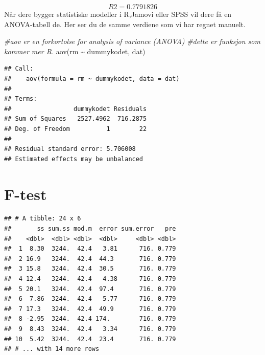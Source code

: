 \documentclass[
]{book}
\newenvironment{Shaded}{\begin{snugshade}}{\end{snugshade}}
\newcommand{\CommentTok}[1]{\textcolor[rgb]{0.56,0.35,0.01}{\textit{#1}}}
\newcommand{\FunctionTok}[1]{\textcolor[rgb]{0.00,0.00,0.00}{#1}}
\newcommand{\NormalTok}[1]{#1}
\newcommand{\SpecialCharTok}[1]{\textcolor[rgb]{0.00,0.00,0.00}{#1}}
\begin{document}
\[
R2 = 0.7791826
\]
Når dere bygger statistiske modeller i R,Jamovi eller SPSS vil dere få en ANOVA-tabell de. Her ser du de samme verdiene som vi har regnet manuelt.

\begin{Shaded}
\begin{Highlighting}[]
\CommentTok{\#aov er en forkortolse for analysis of variance (ANOVA)}
\CommentTok{\#dette er funksjon som kommer mer R.}
\FunctionTok{aov}\NormalTok{(rm }\SpecialCharTok{\textasciitilde{}}\NormalTok{ dummykodet, dat)}
\end{Highlighting}
\end{Shaded}

\begin{verbatim}
## Call:
##    aov(formula = rm ~ dummykodet, data = dat)
## 
## Terms:
##                 dummykodet Residuals
## Sum of Squares   2527.4962  716.2875
## Deg. of Freedom          1        22
## 
## Residual standard error: 5.706008
## Estimated effects may be unbalanced
\end{verbatim}

\hypertarget{f-test}{%
\section{F-test}\label{f-test}}

\begin{verbatim}
## # A tibble: 24 x 6
##       ss sum.ss mod.m  error sum.error   pre
##    <dbl>  <dbl> <dbl>  <dbl>     <dbl> <dbl>
##  1  8.30  3244.  42.4   3.81      716. 0.779
##  2 16.9   3244.  42.4  44.3       716. 0.779
##  3 15.8   3244.  42.4  30.5       716. 0.779
##  4 12.4   3244.  42.4   4.38      716. 0.779
##  5 20.1   3244.  42.4  97.4       716. 0.779
##  6  7.86  3244.  42.4   5.77      716. 0.779
##  7 17.3   3244.  42.4  49.9       716. 0.779
##  8 -2.95  3244.  42.4 174.        716. 0.779
##  9  8.43  3244.  42.4   3.34      716. 0.779
## 10  5.42  3244.  42.4  23.4       716. 0.779
## # ... with 14 more rows
\end{verbatim}

  
\end{document}
